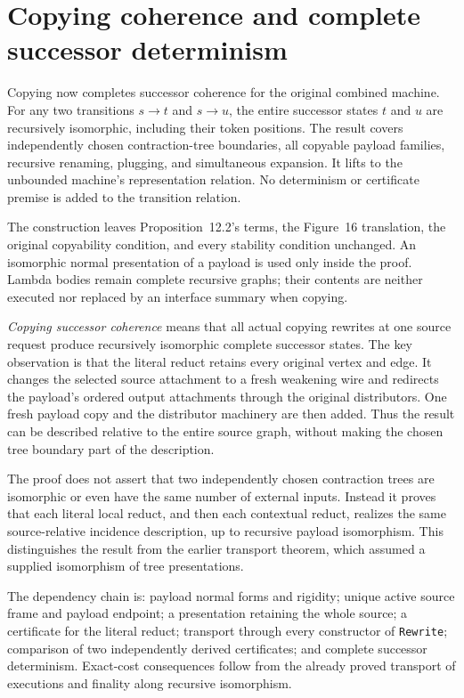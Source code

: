 \clearpage
\section{Copying coherence and complete successor determinism}
\label{sec:copying-successor-coherence}
Copying now completes successor coherence for the original combined machine.
For any two transitions $s\to t$ and $s\to u$, the entire successor states
$t$ and $u$ are recursively isomorphic, including their token positions.
The result covers independently chosen contraction-tree boundaries, all
copyable payload families, recursive renaming, plugging, and simultaneous
expansion. It lifts to the unbounded machine's representation relation.
No determinism or certificate premise is added to the transition relation.

The construction leaves Proposition~12.2's terms, the Figure~16 translation,
the original copyability condition, and every stability condition unchanged.
An isomorphic normal presentation of a payload is used only inside the proof.
Lambda bodies remain complete recursive graphs; their contents are neither
executed nor replaced by an interface summary when copying.

\emph{Copying successor coherence} means that all actual copying rewrites at
one source request produce recursively isomorphic complete successor states.
The key observation is that the literal reduct retains every original
vertex and edge. It changes the selected source attachment to a fresh weakening
wire and redirects the payload's ordered output attachments through the
original distributors. One fresh payload copy and the distributor machinery
are then added. Thus the result can be described relative to the entire source
graph, without making the chosen tree boundary part of the description.

The proof does not assert that two independently chosen contraction trees are
isomorphic or even have the same number of external inputs. Instead it proves
that each literal local reduct, and then each contextual reduct, realizes the
same source-relative incidence description, up to recursive payload isomorphism.
This distinguishes the result from the earlier transport theorem, which
assumed a supplied isomorphism of tree presentations.

The dependency chain is: payload normal forms and rigidity; unique active
source frame and payload endpoint; a presentation retaining the whole source;
a certificate for the literal reduct; transport through every constructor of
\texttt{Rewrite}; comparison of two independently derived certificates; and
complete successor determinism. Exact-cost consequences follow from the
already proved transport of executions and finality along recursive isomorphism.

